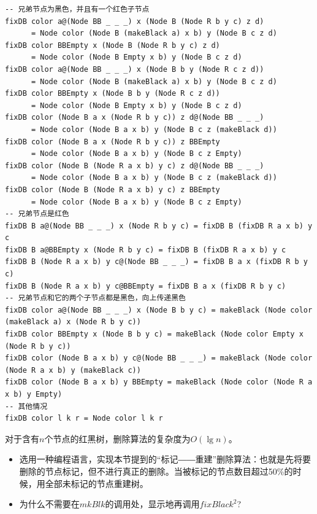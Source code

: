 \documentclass[b5paper]{ctexart}
\begin{document}
\begin{lstlisting}[style=Haskell]
-- 兄弟节点为黑色，并且有一个红色子节点
fixDB color a@(Node BB _ _ _) x (Node B (Node R b y c) z d)
      = Node color (Node B (makeBlack a) x b) y (Node B c z d)
fixDB color BBEmpty x (Node B (Node R b y c) z d)
      = Node color (Node B Empty x b) y (Node B c z d)
fixDB color a@(Node BB _ _ _) x (Node B b y (Node R c z d))
      = Node color (Node B (makeBlack a) x b) y (Node B c z d)
fixDB color BBEmpty x (Node B b y (Node R c z d))
      = Node color (Node B Empty x b) y (Node B c z d)
fixDB color (Node B a x (Node R b y c)) z d@(Node BB _ _ _)
      = Node color (Node B a x b) y (Node B c z (makeBlack d))
fixDB color (Node B a x (Node R b y c)) z BBEmpty
      = Node color (Node B a x b) y (Node B c z Empty)
fixDB color (Node B (Node R a x b) y c) z d@(Node BB _ _ _)
      = Node color (Node B a x b) y (Node B c z (makeBlack d))
fixDB color (Node B (Node R a x b) y c) z BBEmpty
      = Node color (Node B a x b) y (Node B c z Empty)
-- 兄弟节点是红色
fixDB B a@(Node BB _ _ _) x (Node R b y c) = fixDB B (fixDB R a x b) y c
fixDB B a@BBEmpty x (Node R b y c) = fixDB B (fixDB R a x b) y c
fixDB B (Node R a x b) y c@(Node BB _ _ _) = fixDB B a x (fixDB R b y c)
fixDB B (Node R a x b) y c@BBEmpty = fixDB B a x (fixDB R b y c)
-- 兄弟节点和它的两个子节点都是黑色，向上传递黑色
fixDB color a@(Node BB _ _ _) x (Node B b y c) = makeBlack (Node color (makeBlack a) x (Node R b y c))
fixDB color BBEmpty x (Node B b y c) = makeBlack (Node color Empty x (Node R b y c))
fixDB color (Node B a x b) y c@(Node BB _ _ _) = makeBlack (Node color (Node R a x b) y (makeBlack c))
fixDB color (Node B a x b) y BBEmpty = makeBlack (Node color (Node R a x b) y Empty)
-- 其他情况
fixDB color l k r = Node color l k r
\end{lstlisting}

对于含有$n$个节点的红黑树，删除算法的复杂度为$O(\lg n)$。

\begin{Exercise}

\begin{itemize}
\item 选用一种编程语言，实现本节提到的“标记――重建”删除算法：也就是先将要删除的节点标记，但不进行真正的删除。当被标记的节点数目超过50\%的时候，用全部未标记的节点重建树。
\item 为什么不需要在$mkBlk$的调用处，显示地再调用$fixBlack^2$?
\end{itemize}

\end{Exercise}
\end{document}
